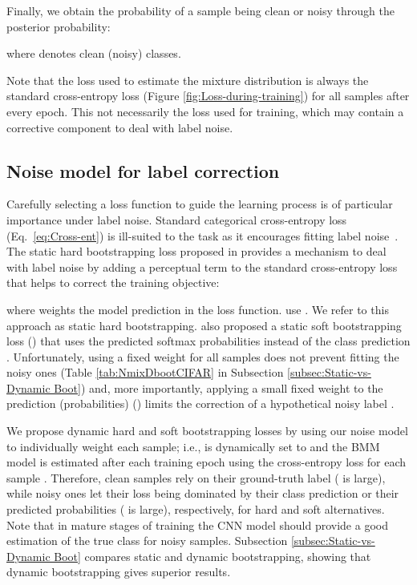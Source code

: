 \documentclass{article}
\begin{document}
Finally, we obtain the probability of a sample being clean or noisy
through the posterior probability: 

where  denotes clean (noisy) classes.

Note that the loss used to estimate the mixture distribution is always the standard cross-entropy loss (Figure \ref{fig:Loss-during-training}) for all samples after every epoch. This not necessarily the loss used for training, which may contain a corrective component to deal with label noise.

\subsection{Noise model for label correction\label{subsec:DynamicBootstrapping}}

Carefully selecting a loss function to guide the learning process is of 
particular importance under label noise. Standard categorical cross-entropy
loss (Eq.~\eqref{eq:Cross-ent}) is ill-suited to the task as it encourages 
fitting label noise~\cite{2017_ICLR_Rethinking}.
The static hard bootstrapping loss proposed in \cite{2015_ICLR_Bootstrapping}
provides a mechanism to deal with label noise by adding a perceptual term to the standard
cross-entropy loss that helps to correct the training
objective: 

where  weights the model prediction  in the loss function.
\cite{2015_ICLR_Bootstrapping} use .
We refer to this approach as static hard bootstrapping. 
\cite{2015_ICLR_Bootstrapping} also proposed a static soft bootstrapping loss ()
that uses the predicted softmax probabilities 
instead of the class prediction . Unfortunately, using a fixed
weight for all samples does not prevent fitting the noisy ones (Table \ref{tab:NmixDbootCIFAR} in Subsection \ref{subsec:Static-vs-Dynamic Boot})
and, more importantly, applying a small fixed weight  to
the prediction (probabilities)  () limits the correction of a hypothetical noisy label .

We propose dynamic hard and soft bootstrapping losses by
using our noise model to individually weight each sample; i.e., 
is dynamically set to  and the BMM
model is estimated after each training epoch using the cross-entropy
loss for each sample . Therefore, clean samples rely on
their ground-truth label  ( is large), while noisy
ones let their loss being dominated by their class prediction 
or their predicted probabilities  ( is large),
respectively, for hard and soft alternatives. Note that in mature
stages of training the CNN model should provide a good
estimation of the true class for noisy samples. Subsection
\ref{subsec:Static-vs-Dynamic Boot} compares static and dynamic 
bootstrapping, showing that dynamic bootstrapping gives superior results.
\end{document}
